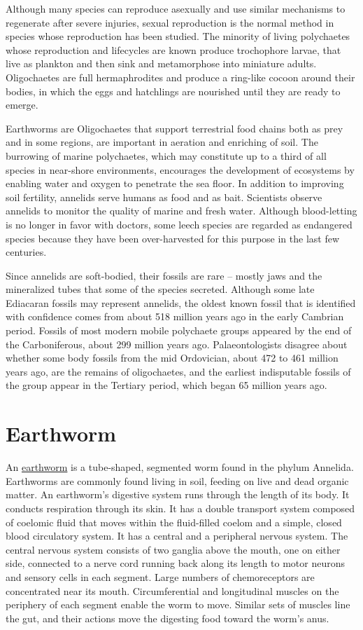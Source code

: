 Although many species can reproduce asexually and use similar mechanisms
to regenerate after severe injuries, sexual reproduction is the normal
method in species whose reproduction has been studied. The minority of
living polychaetes whose reproduction and lifecycles are known produce
trochophore larvae, that live as plankton and then sink and metamorphose
into miniature adults. Oligochaetes are full hermaphrodites and produce
a ring-like cocoon around their bodies, in which the eggs and hatchlings
are nourished until they are ready to emerge.

Earthworms are Oligochaetes that support terrestrial food chains both as
prey and in some regions, are important in aeration and enriching of
soil. The burrowing of marine polychaetes, which may constitute up to a
third of all species in near-shore environments, encourages the
development of ecosystems by enabling water and oxygen to penetrate the
sea floor. In addition to improving soil fertility, annelids serve
humans as food and as bait. Scientists observe annelids to monitor the
quality of marine and fresh water. Although blood-letting is no longer
in favor with doctors, some leech species are regarded as endangered
species because they have been over-harvested for this purpose in the
last few centuries.

Since annelids are soft-bodied, their fossils are rare -- mostly jaws
and the mineralized tubes that some of the species secreted. Although
some late Ediacaran fossils may represent annelids, the oldest known
fossil that is identified with confidence comes from about 518 million
years ago in the early Cambrian period. Fossils of most modern mobile
polychaete groups appeared by the end of the Carboniferous, about 299
million years ago. Palaeontologists disagree about whether some body
fossils from the mid Ordovician, about 472 to 461 million years ago, are
the remains of oligochaetes, and the earliest indisputable fossils of
the group appear in the Tertiary period, which began 65 million years
ago.

\section{Earthworm}\label{earthworm}

An \href{https://en.wikipedia.org/wiki/Earthworm}{earthworm} is a
tube-shaped, segmented worm found in the phylum Annelida. Earthworms are
commonly found living in soil, feeding on live and dead organic matter.
An earthworm's digestive system runs through the length of its body. It
conducts respiration through its skin. It has a double transport system
composed of coelomic fluid that moves within the fluid-filled coelom and
a simple, closed blood circulatory system. It has a central and a
peripheral nervous system. The central nervous system consists of two
ganglia above the mouth, one on either side, connected to a nerve cord
running back along its length to motor neurons and sensory cells in each
segment. Large numbers of chemoreceptors are concentrated near its
mouth. Circumferential and longitudinal muscles on the periphery of each
segment enable the worm to move. Similar sets of muscles line the gut,
and their actions move the digesting food toward the worm's anus.

